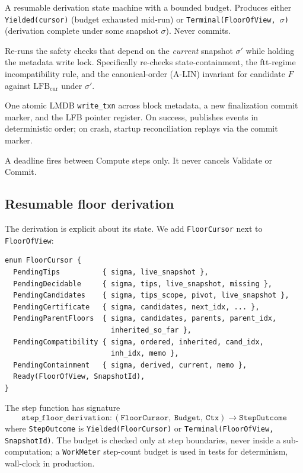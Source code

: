 \documentclass[11pt]{article}
\newcommand{\sigid}{\ensuremath{\sigma}}
\newcommand{\lfbcur}{\ensuremath{\mathrm{LFB}_{\mathrm{cur}}}}
\newcommand{\code}[1]{\texttt{#1}}
\begin{document}
\begin{description}[style=nextline]
\item[Compute] A resumable derivation state machine with a bounded
budget. Produces either \code{Yielded(cursor)} (budget exhausted
mid-run) or \code{Terminal(FloorOfView, $\sigid$)} (derivation complete
under some snapshot $\sigid$). Never commits.
\item[Validate] Re-runs the safety checks that depend on the
\emph{current} snapshot $\sigid'$ while holding the metadata write lock.
Specifically re-checks state-containment, the ftt-regime
incompatibility rule, and the canonical-order (A-LIN) invariant for
candidate $F$ against $\lfbcur$ under $\sigid'$.
\item[Commit] One atomic LMDB \code{write\_txn} across block metadata, a
new finalization commit marker, and the LFB pointer register. On
success, publishes events in deterministic order; on crash, startup
reconciliation replays via the commit marker.
\end{description}

A deadline fires between Compute steps only. It never cancels Validate
or Commit.

\subsection{Resumable floor derivation}

The derivation is explicit about its state. We add
\code{FloorCursor} next to \code{FloorOfView}:

\begin{lstlisting}[basicstyle=\small\ttfamily,columns=flexible]
enum FloorCursor {
  PendingTips          { sigma, live_snapshot },
  PendingDecidable     { sigma, tips, live_snapshot, missing },
  PendingCandidates    { sigma, tips_scope, pivot, live_snapshot },
  PendingCertificate   { sigma, candidates, next_idx, ... },
  PendingParentFloors  { sigma, candidates, parents, parent_idx,
                         inherited_so_far },
  PendingCompatibility { sigma, ordered, inherited, cand_idx,
                         inh_idx, memo },
  PendingContainment   { sigma, derived, current, memo },
  Ready(FloorOfView, SnapshotId),
}
\end{lstlisting}

The step function has signature
\[
  \code{step\_floor\_derivation}: (\code{FloorCursor},\ \code{Budget},\ \code{Ctx})
     \to \code{StepOutcome}
\]
where \code{StepOutcome} is \code{Yielded(FloorCursor)} or
\code{Terminal(FloorOfView, SnapshotId)}. The budget is checked only at
step boundaries, never inside a sub-computation; a \code{WorkMeter}
step-count budget is used in tests for determinism, wall-clock in
production.
\end{document}
